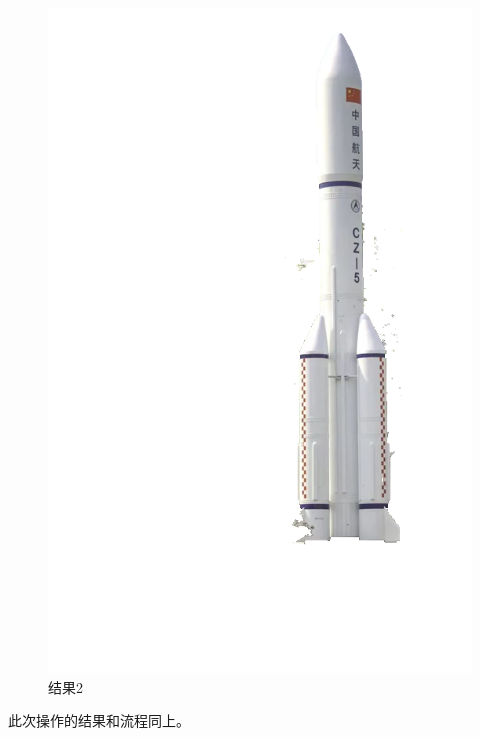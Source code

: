 \documentclass[12pt,a4paper]{article}
\begin{document}
\begin{CJK}{UTF8}{gbsn}
\begin{sloppypar}
\begin{figure}[H]
\begin{minipage}{0.3\linewidth}
		\includegraphics[width=0.9\linewidth]{out.png}
		\caption{结果2}
		\label{f4}%
	\end{minipage}
\end{figure}
此次操作的结果和流程同上。


\end{sloppypar}
\end{CJK}
\end{document}
